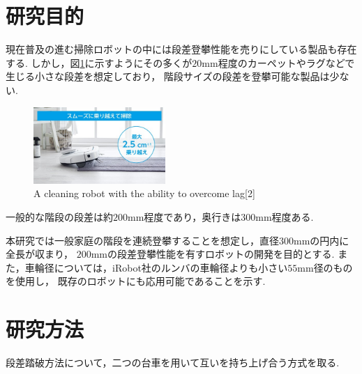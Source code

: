 \documentclass[dvipdfmx]{jsarticle}
\begin{document}
\section{研究目的}
現在普及の進む掃除ロボットの中には段差登攀性能を売りにしている製品も存在する.
しかし，図\ref{fig:rulo}に示すようにその多くが$20\mathrm{mm}$程度のカーペットやラグなどで生じる小さな段差を想定しており，
階段サイズの段差を登攀可能な製品は少ない.
\begin{figure}[H]
  \centering
  \includegraphics[width=50mm]{image/rulo.jpg}
  \caption{A cleaning robot with the ability to overcome lag[2]}
\label{fig:rulo}
\end{figure}

一般的な階段の段差は約$200\mathrm{mm}$程度であり，奥行きは$300\mathrm{mm}$程度ある.

本研究では一般家庭の階段を連続登攀することを想定し，直径$300\mathrm{mm}$の円内に全長が収まり，
$200\mathrm{mm}$の段差登攀性能を有すロボットの開発を目的とする.
また，車輪径については，iRobot社のルンバの車輪径よりも小さい$55\mathrm{mm}$径のものを使用し，
既存のロボットにも応用可能であることを示す.

\section{研究方法}
段差踏破方法について，二つの台車を用いて互いを持ち上げ合う方式を取る.
\end{document}
